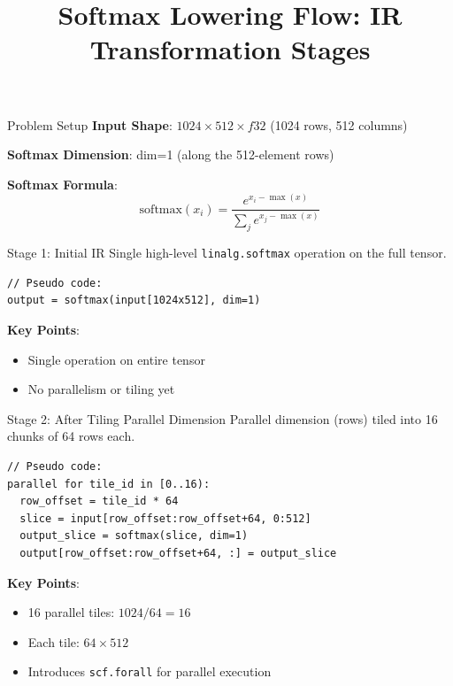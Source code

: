 \documentclass[aspectratio=169]{beamer}
\title{Softmax Lowering Flow: IR Transformation Stages}
\author{}
\date{}
\begin{document}
\begin{frame}
\titlepage
\end{frame}

\begin{frame}{Problem Setup}
\textbf{Input Shape}: $1024 \times 512 \times f32$ (1024 rows, 512 columns)

\textbf{Softmax Dimension}: dim=1 (along the 512-element rows)

\vspace{0.5cm}

\textbf{Softmax Formula}:
$$\text{softmax}(x_i) = \frac{e^{x_i - \max(x)}}{\sum_j e^{x_j - \max(x)}}$$
\end{frame}

\begin{frame}[fragile]{Stage 1: Initial IR}
Single high-level \texttt{linalg.softmax} operation on the full tensor.

\begin{lstlisting}
// Pseudo code:
output = softmax(input[1024x512], dim=1)
\end{lstlisting}

\vspace{0.3cm}

\textbf{Key Points}:
\begin{itemize}
\item Single operation on entire tensor
\item No parallelism or tiling yet
\end{itemize}
\end{frame}

\begin{frame}[fragile]{Stage 2: After Tiling Parallel Dimension}
Parallel dimension (rows) tiled into 16 chunks of 64 rows each.

\begin{lstlisting}
// Pseudo code:
parallel for tile_id in [0..16):
  row_offset = tile_id * 64
  slice = input[row_offset:row_offset+64, 0:512]
  output_slice = softmax(slice, dim=1)
  output[row_offset:row_offset+64, :] = output_slice
\end{lstlisting}

\vspace{0.3cm}

\textbf{Key Points}:
\begin{itemize}
\item 16 parallel tiles: $1024 / 64 = 16$
\item Each tile: $64 \times 512$
\item Introduces \texttt{scf.forall} for parallel execution
\end{itemize}
\end{frame}
\end{document}
